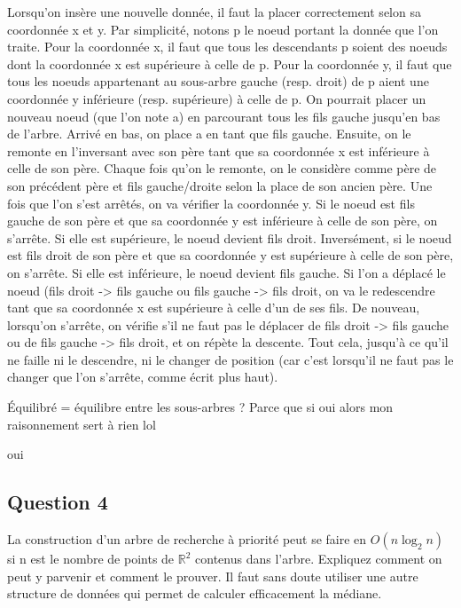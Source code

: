 \documentclass{article}
\newcommand{\black}{\color{black}}
\begin{document}
Lorsqu'on insère une nouvelle donnée, il faut la placer correctement selon sa coordonnée x et y. 
Par simplicité, notons p le noeud portant la donnée que l'on traite. 
Pour la coordonnée x, il faut que tous les descendants p soient des noeuds dont la coordonnée x est supérieure à celle de p. Pour la coordonnée y, 
il faut que tous les noeuds appartenant au sous-arbre gauche (resp. droit) de p aient une coordonnée y inférieure (resp. supérieure) à celle de p. 
On pourrait placer un nouveau noeud (que l'on note a) en parcourant tous les fils gauche jusqu'en bas de l'arbre. Arrivé en bas, on place a en tant que fils gauche. 
Ensuite, on le remonte en l'inversant avec son père tant que sa coordonnée x est inférieure à celle de son père. 
Chaque fois qu'on le remonte, on le considère comme père de son précédent père et fils gauche/droite selon la place de son ancien père. 
Une fois que l'on s'est arrêtés, on va vérifier la coordonnée y. Si le noeud est fils gauche de son père et que sa coordonnée y est inférieure à celle de son père, on s'arrête. 
Si elle est supérieure, le noeud devient fils droit. Inversément, si le noeud est fils droit de son père et que sa coordonnée y est supérieure à celle de son père, on s'arrête. 
Si elle est inférieure, le noeud devient fils gauche. Si l'on a déplacé le noeud (fils droit -> fils gauche ou fils gauche -> fils droit, 
on va le redescendre tant que sa coordonnée x est supérieure à celle d'un de ses fils. De nouveau, lorsqu'on s'arrête, 
on vérifie s'il ne faut pas le déplacer de fils droit -> fils gauche ou de fils gauche -> fils droit,
et on répète la descente. Tout cela, jusqu'à ce qu'il ne faille ni le descendre, ni le changer de position 
(car c'est lorsqu'il ne faut pas le changer que l'on s'arrête, comme écrit plus haut). 

Équilibré = équilibre entre les sous-arbres ? Parce que si oui alors mon raisonnement sert à rien lol

\black

oui %

\subsection{Question 4} La construction d'un arbre de recherche à priorité peut se faire en $O(n \log_2 n)$ si n est le nombre de points de $\mathbb{R}^2$ contenus dans l'arbre. 
Expliquez comment on peut y parvenir et comment le prouver. 
Il faut sans doute utiliser une autre structure de données qui permet de calculer efficacement la médiane.
\end{document}
